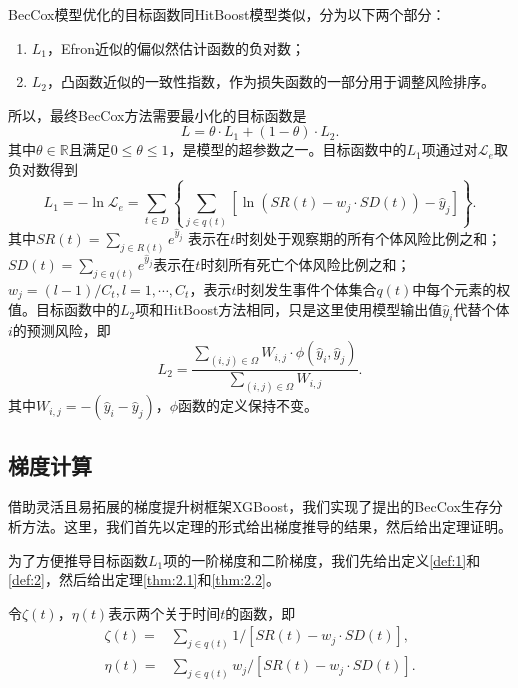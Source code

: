 BecCox模型优化的目标函数同HitBoost模型类似，分为以下两个部分：
\begin{enumerate}
	\item $L_1$，Efron近似的偏似然估计函数的负对数；
	\item $L_2$，凸函数近似的一致性指数，作为损失函数的一部分用于调整风险排序。
\end{enumerate}
所以，最终BecCox方法需要最小化的目标函数是
\begin{equation}
L = \theta \cdot L_1 + (1- \theta) \cdot L_2.
\end{equation}
其中$\theta \in \mathbb{R}$且满足$0 \le \theta \le 1$，是模型的超参数之一。目标函数中的$L_1$项通过对$\mathcal{L}_e$取负对数得到
\begin{equation}
L_1 = -\ln\mathcal{L}_e = \sum_{t\in D} \left\{ \sum_{j\in q(t)} [\ln(SR(t)-w_j\cdot SD(t))-\hat{y}_j] \right\}.
\end{equation}
其中$SR(t)=\sum_{j\in R(t)} e^{\hat{y}_j}$ 表示在$t$时刻处于观察期的所有个体风险比例之和；$SD(t)=\sum_{j\in q(t)} e^{\hat{y}_j}$表示在$t$时刻所有死亡个体风险比例之和；$w_j=(l-1)/C_t, l=1,\cdots,C_t$，表示$t$时刻发生事件个体集合$q(t)$中每个元素的权值。目标函数中的$L_2$项和HitBoost方法相同，只是这里使用模型输出值$\hat{y}_i$代替个体$i$的预测风险，即
\begin{equation}
L_2 = \frac{\sum_{(i,j)\in \Omega} W_{i,j}\cdot \phi(\hat{y}_i, \hat{y}_j)}{\sum_{(i,j)\in \Omega} W_{i,j}}.
\end{equation}
其中$W_{i,j}=-(\hat{y}_i-\hat{y}_j)$，$\phi$函数的定义保持不变。

\subsection{梯度计算}

借助灵活且易拓展的梯度提升树框架XGBoost，我们实现了提出的BecCox生存分析方法。这里，我们首先以定理的形式给出梯度推导的结果，然后给出定理证明。

为了方便推导目标函数$L_1$项的一阶梯度和二阶梯度，我们先给出定义\ref{def:1}和\ref{def:2}，然后给出定理\ref{thm:2.1}和\ref{thm:2.2}。

\begin{definition}\label{def:1}
令$\zeta(t)$，$\eta(t)$表示两个关于时间$t$的函数，即\[
\begin{split}
\zeta(t) =& \sum_{j\in q(t)} 1/[SR(t) - w_j\cdot SD(t)], \\
\eta(t)  =& \sum_{j\in q(t)} w_j/[SR(t) - w_j\cdot SD(t)].
\end{split}
\]
\end{definition}

